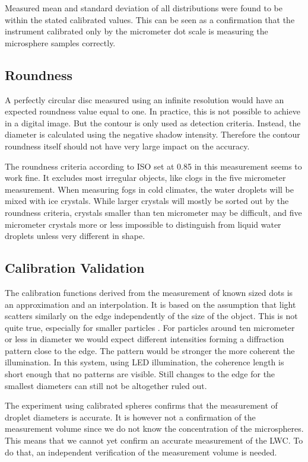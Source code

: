 Measured mean and standard deviation of all distributions were found to be within the stated calibrated values. This can be seen as a confirmation that the instrument calibrated only by the micrometer dot scale is measuring the microsphere samples correctly.

\subsection{Roundness}

A perfectly circular disc measured using an infinite resolution would have an expected roundness value equal to one. In practice, this is not possible to achieve in a digital image. But the contour is only used as detection criteria. Instead, the diameter is calculated using the negative shadow intensity. Therefore the contour roundness itself should not have very large impact on the accuracy.

The roundness criteria according to ISO \cite{iso12181} set at 0.85 in this measurement seems to work fine. It excludes most irregular objects, like clogs in the five micrometer measurement. When measuring fogs in cold climates, the water droplets will be mixed with ice crystals. While larger crystals will mostly be sorted out by the roundness criteria, crystals smaller than ten micrometer may be difficult, and five micrometer crystals more or less impossible to distinguish from liquid water droplets unless very different in shape.

\subsection{Calibration Validation}

The calibration functions derived from the measurement of known sized dots is an approximation and an interpolation. It is based on the assumption that light scatters similarly on the edge independently of the size of the object. This is not quite true, especially for smaller particles \cite{bohr2008}. For particles around ten micrometer or less in diameter we would expect different intensities forming a diffraction pattern close to the edge. The pattern would be stronger the more coherent the illumination. In this system, using LED illumination, the coherence length is short enough that no patterns are visible. Still changes to the edge for the smallest diameters can still not be altogether ruled out.

The experiment using calibrated spheres confirms that the measurement of droplet diameters is accurate. It is however not a confirmation of the measurement volume \cite{ryd2016} since we do not know the concentration of the microspheres. This means that we cannot yet confirm an accurate measurement of the LWC. To do that, an independent verification of the measurement volume is needed.



